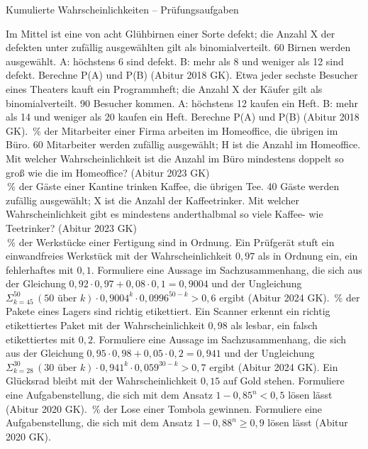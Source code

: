\begin{aufgabe}{Kumulierte Wahrscheinlichkeiten – Prüfungsaufgaben}
\begin{teile}
\teil Im Mittel ist eine von acht Glühbirnen einer Sorte defekt; die Anzahl X der defekten unter zufällig ausgewählten gilt als binomialverteilt. 60 Birnen werden ausgewählt. A: höchstens 6 sind defekt. B: mehr als 8 und weniger als 12 sind defekt. Berechne P(A) und P(B) \hfill (Abitur 2018 GK).
\teil Etwa jeder sechste Besucher eines Theaters kauft ein Programmheft; die Anzahl X der Käufer gilt als binomialverteilt. 90 Besucher kommen. A: höchstens 12 kaufen ein Heft. B: mehr als 14 und weniger als 20 kaufen ein Heft. Berechne P(A) und P(B) \hfill (Abitur 2018 GK).
\,\% der Mitarbeiter einer Firma arbeiten im Homeoffice, die übrigen im Büro. 60 Mitarbeiter werden zufällig ausgewählt; H ist die Anzahl im Homeoffice. Mit welcher Wahrscheinlichkeit ist die Anzahl im Büro mindestens doppelt so groß wie die im Homeoffice? \hfill (Abitur 2023 GK) \\ \leerfeld
{}\,\% der Gäste einer Kantine trinken Kaffee, die übrigen Tee. 40 Gäste werden zufällig ausgewählt; X ist die Anzahl der Kaffeetrinker. Mit welcher Wahrscheinlichkeit gibt es mindestens anderthalbmal so viele Kaffee- wie Teetrinker? \hfill (Abitur 2023 GK) \\ \leerfeld
{}\,\% der Werkstücke einer Fertigung sind in Ordnung. Ein Prüfgerät stuft ein einwandfreies Werkstück mit der Wahrscheinlichkeit $0{,}97$ als in Ordnung ein, ein fehlerhaftes mit $0{,}1$. Formuliere eine Aussage im Sachzusammenhang, die sich aus der Gleichung $0{,}92 \cdot 0{,}97 + 0{,}08 \cdot 0{,}1 = 0{,}9004$ und der Ungleichung $\Sigma_{k=45}^{50}\, (50 \text{ über } k) \cdot 0{,}9004^k \cdot 0{,}0996^{50-k} > 0{,}6$ ergibt \hfill (Abitur 2024 GK).
\,\% der Pakete eines Lagers sind richtig etikettiert. Ein Scanner erkennt ein richtig etikettiertes Paket mit der Wahrscheinlichkeit $0{,}98$ als lesbar, ein falsch etikettiertes mit $0{,}2$. Formuliere eine Aussage im Sachzusammenhang, die sich aus der Gleichung $0{,}95 \cdot 0{,}98 + 0{,}05 \cdot 0{,}2 = 0{,}941$ und der Ungleichung $\Sigma_{k=28}^{30}\, (30 \text{ über } k) \cdot 0{,}941^k \cdot 0{,}059^{30-k} > 0{,}7$ ergibt \hfill (Abitur 2024 GK).
\teil Ein Glücksrad bleibt mit der Wahrscheinlichkeit $0{,}15$ auf Gold stehen. Formuliere eine Aufgabenstellung, die sich mit dem Ansatz $1 - 0{,}85^n < 0{,}5$ lösen lässt \hfill (Abitur 2020 GK).
\,\% der Lose einer Tombola gewinnen. Formuliere eine Aufgabenstellung, die sich mit dem Ansatz $1 - 0{,}88^n \ge 0{,}9$ lösen lässt \hfill (Abitur 2020 GK).
\end{teile}
\end{aufgabe}

